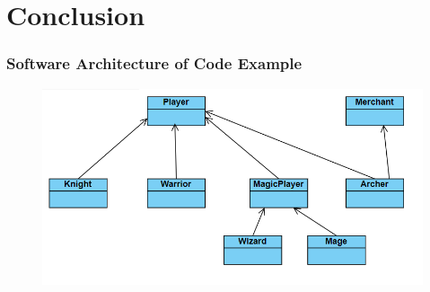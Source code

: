 \documentclass{beamer}
\begin{document}
\section{Conclusion}
\begin{frame}\frametitle{Software Architecture of Code Example}
\begin{figure}
    \includegraphics[width=12cm]{code.png}
\end{figure}
\end{frame}


\end{document}
